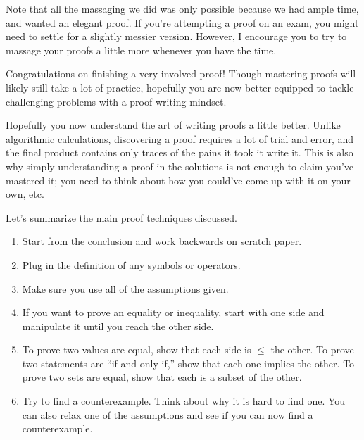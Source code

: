 \documentclass[11pt]{article}
\begin{document}
    Note that all the massaging we did was only possible because we had ample time, and
    wanted an elegant proof. If you're attempting a proof on an exam, you might need
    to settle for a slightly messier version. However, I encourage you to try to massage
    your proofs a little more whenever you have the time.
    
    Congratulations on finishing a very involved proof! Though mastering proofs will 
    likely still take a lot of practice, hopefully you are now better equipped to tackle
    challenging problems with a proof-writing mindset.
    

    Hopefully you now understand the art of writing proofs a little better. Unlike 
    algorithmic calculations, discovering a proof requires a lot of trial and error,
    and the final product contains only traces of the pains it took it write it. This
    is also why simply understanding a proof in the solutions is not enough to claim
    you've mastered it; you need to think about how you could've come up with it on
    your own, etc.
    
    Let's summarize the main proof techniques discussed.
    
    \begin{enumerate}
        \item
        Start from the conclusion and work backwards on scratch paper.
        
        \item
        Plug in the definition of any symbols or operators.
        
        \item
        Make sure you use all of the assumptions given.
        
        \item
        If you want to prove an equality or inequality, start with one side and manipulate
        it until you reach the other side.
        
        \item
        To prove two values are equal, show that each side is $\leq$ the other. To prove
        two statements are ``if and only if,'' show that each one implies the other. To
        prove two sets are equal, show that each is a subset of the other.
    
        \item
        Try to find a counterexample. Think about why it is hard to find one. You can also
        relax one of the assumptions and see if you can now find a counterexample.
        
    \end{enumerate}
\end{document}
